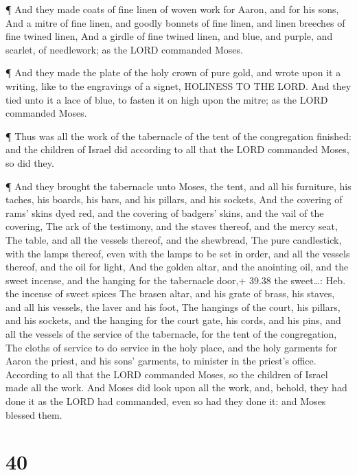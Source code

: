  ¶ And they made coats of fine linen of woven work for
Aaron, and for his sons,  And a mitre of fine linen, and
goodly bonnets of fine linen, and linen breeches of fine twined linen,
 And a girdle of fine twined linen, and blue, and purple,
and scarlet, of needlework; as the LORD commanded Moses.

 ¶ And they made the plate of the holy crown of pure gold,
and wrote upon it a writing, like to the engravings of a signet,
HOLINESS TO THE LORD.  And they tied unto it a lace of
blue, to fasten it on high upon the mitre; as the LORD commanded Moses.

 ¶ Thus was all the work of the tabernacle of the tent of
the congregation finished: and the children of Israel did according to
all that the LORD commanded Moses, so did they.

 ¶ And they brought the tabernacle unto Moses, the tent,
and all his furniture, his taches, his boards, his bars, and his
pillars, and his sockets,  And the covering of rams' skins
dyed red, and the covering of badgers' skins, and the vail of the
covering,  The ark of the testimony, and the staves
thereof, and the mercy seat,  The table, and all the
vessels thereof, and the shewbread,  The pure candlestick,
with the lamps thereof, even with the lamps to be set in order, and all
the vessels thereof, and the oil for light,  And the golden
altar, and the anointing oil, and the sweet incense, and the hanging for
the tabernacle door,+ 39.38 the sweet\ldots: Heb. the incense of sweet
spices  The brasen altar, and his grate of brass, his
staves, and all his vessels, the laver and his foot,  The
hangings of the court, his pillars, and his sockets, and the hanging for
the court gate, his cords, and his pins, and all the vessels of the
service of the tabernacle, for the tent of the congregation,
 The cloths of service to do service in the holy place, and
the holy garments for Aaron the priest, and his sons' garments, to
minister in the priest's office.  According to all that the
LORD commanded Moses, so the children of Israel made all the work.
 And Moses did look upon all the work, and, behold, they
had done it as the LORD had commanded, even so had they done it: and
Moses blessed them.

\hypertarget{section-39}{%
\section{40}\label{section-39}}

